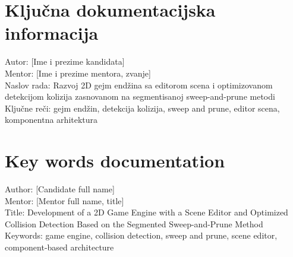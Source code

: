 \documentclass[12pt,a4paper]{report}
\begin{document}
\chapter*{Ključna dokumentacijska informacija}

Autor: [Ime i prezime kandidata] \\
Mentor: [Ime i prezime mentora, zvanje] \\
Naslov rada: Razvoj 2D gejm endžina sa editorom scena i optimizovanom detekcijom kolizija zasnovanom na segmentisanoj sweep-and-prune metodi \\
Ključne reči: gejm endžin, detekcija kolizija, sweep and prune, editor scena, komponentna arhitektura

\chapter*{Key words documentation}

Author: [Candidate full name] \\
Mentor: [Mentor full name, title] \\
Title: Development of a 2D Game Engine with a Scene Editor and Optimized Collision Detection Based on the Segmented Sweep-and-Prune Method \\
Keywords: game engine, collision detection, sweep and prune, scene editor, component-based architecture
\end{document}
